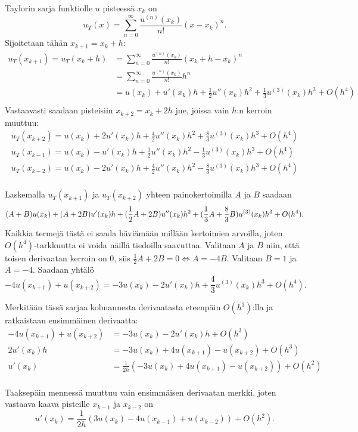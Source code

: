 \documentclass{article}
\begin{document}
Taylorin sarja funktiolle $u$ pisteessä $x_k$ on
\[
  u_T(x) = \sum_{n=0}^{\infty} \frac{u^{(n)}(x_k)}{n!}(x - x_k)^n.
\]
Sijoitetaan tähän $x_{k+1} = x_k + h$:
\begin{align*}
  u_T(x_{k+1}) = u_T(x_k + h)
    &= \sum_{n=0}^{\infty} \frac{u^{(n)}(x_k)}{n!}(x_k + h - x_k)^n \\
    &= \sum_{n=0}^{\infty} \frac{u^{(n)}(x_k)}{n!}h^n \\
    &= u(x_k) + u'(x_k)h + \frac{1}{2}u''(x_k)h^2 + \frac{1}{3}u^{(3)}(x_k)h^3 + O(h^4) \\
\end{align*}
Vastaavasti saadaan pisteisiin $x_{k+2} = x_k + 2h$ jne, joissa vain $h$:n kerroin muuttuu:
\begin{gather*}
  u_T(x_{k+2}) = u(x_k) + 2u'(x_k)h + \frac{4}{2}u''(x_k)h^2 + \frac{8}{3}u^{(3)}(x_k)h^3 + O(h^4) \\
  u_T(x_{k-1}) = u(x_k) - u'(x_k)h + \frac{1}{2}u''(x_k)h^2 - \frac{1}{3}u^{(3)}(x_k)h^3 + O(h^4) \\
  u_T(x_{k-2}) = u(x_k) - 2u'(x_k)h + \frac{4}{2}u''(x_k)h^2 - \frac{8}{3}u^{(3)}(x_k)h^3 + O(h^4) \\
\end{gather*}

Laskemalla $u_T(x_{k+1})$ ja $u_T(x_{k+2})$ yhteen painokertoimilla $A$ ja $B$ saadaan
\[
  (A+B)u(x_k) + (A+2B)u'(x_k)h + (\frac{1}{2}A+2B)u''(x_k)h^2
    + (\frac{1}{3}A+\frac{8}{3}B)u^{(3)}(x_k)h^3 + O(h^4). \\
\]
Kaikkia termejä tästä ei saada häviämään millään kertoimien arvoilla, joten
$O(h^4)$-tarkkuutta ei voida näillä tiedoilla saavuttaa.
Valitaan $A$ ja $B$ niin, että toisen derivaatan kerroin on 0,
siis $\frac{1}{2}A+2B = 0 \iff A=-4B$. Valitaan $B = 1$ ja $A = -4$. Saadaan yhtälö
\[
  -4u(x_{k+1}) + u(x_{k+2}) = -3u(x_k) - 2u'(x_k)h + \frac{4}{3}u^{(3)}(x_k)h^3 + O(h^4).
\]

Merkitään tässä sarjaa kolmannesta derivaatasta eteenpäin $O(h^3)$:lla ja ratkaistaan
ensimmäinen derivaatta:
\begin{align*}
  -4u(x_{k+1}) + u(x_{k+2}) &= -3u(x_k) - 2u'(x_k)h + O(h^3) \\
  2u'(x_k)h &= -3u(x_k) + 4u(x_{k+1}) - u(x_{k+2}) + O(h^3) \\
  u'(x_k) &= \frac{1}{2h}(-3u(x_k) + 4u(x_{k+1}) - u(x_{k+2})) + O(h^2) \\
\end{align*}

Taaksepäin mennessä muuttuu vain ensimmäisen derivaatan merkki, joten vastaava
kaava pisteille $x_{k-1}$ ja $x_{k-2}$ on
\[
  u'(x_k) = \frac{1}{2h}(3u(x_k) - 4u(x_{k-1}) + u(x_{k-2})) + O(h^2).
\]
\end{document}
